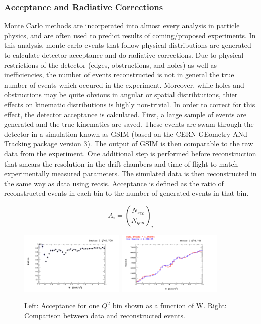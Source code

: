 \subsubsection{Acceptance and Radiative Corrections}
Monte Carlo methods are incorperated into almost every analysis in particle physics, and are often used to predict results of coming/proposed experiments.  In this analysis, monte carlo events that follow physical distributions are generated to calculate detector acceptance and do radiative corrections.  Due to physical restrictions of the detector (edges, obstructions, and holes) as well as inefficiencies, the number of events reconstructed is not in general the true number of events which occured in the experiment.  Moreover, while holes and obstructions may be quite obvious in angular or spatial distribtutions, thier effects on kinematic distributions is highly non-trivial.  In order to correct for this effect, the detector acceptance is calculated.  First, a large sample of events are generated and the true kinematics are saved.  These events are swam through the detector in a simulation known as GSIM (based on the CERN GEometry ANd Tracking package version 3).  The output of GSIM is then comparable to the raw data from the experiment.  One additional step is performed before reconstruction that smears the resolution in the drift chambers and time of flight to match experimentally measured parameters.  The simulated data is then reconstructed in the same way as data using recsis.  Acceptance is defined as the ratio of reconstructed events in each bin to the number of generated events in that bin.

\begin{equation}
  A_{i} = \left( \frac{N_{rec}}{N_{gen}} \right)_{i}
\end{equation}

\begin{figure}
  \centering
  \includegraphics[width=5cm]{image/acceptanceSector0Slice4.png}
  \includegraphics[width=5cm]{image/compareDataSimSector0Slice4.png}
  \caption{Left: Acceptance for one $Q^{2}$ bin shown as a function of W.  Right: Comparison between data and reconstructed events. }
  \label{fig:acceptance}
\end{figure}

